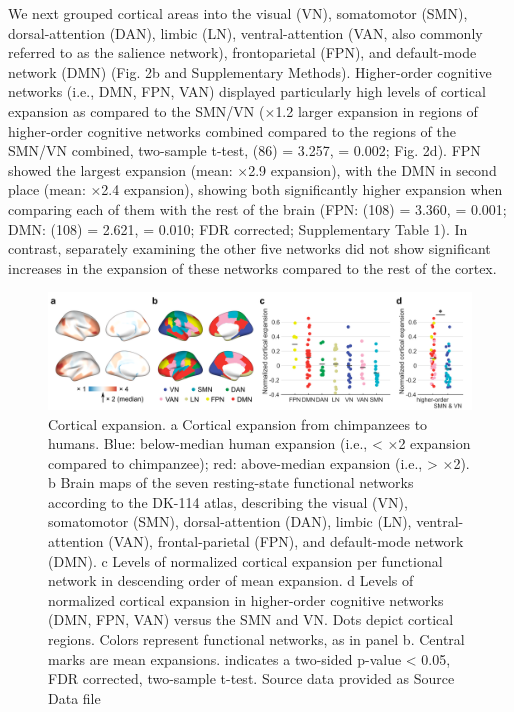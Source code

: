 \begin{refsection}
We next grouped cortical areas into the visual (VN), somatomotor (SMN), dorsal-attention (DAN), limbic (LN), ventral-attention (VAN, also commonly referred to as the salience network), frontoparietal (FPN), and default-mode network (DMN) (Fig. 2b and Supplementary Methods)\citep{thomas2011organization}. Higher-order cognitive networks (i.e., DMN, FPN, VAN) displayed particularly high levels of cortical expansion as compared to the SMN/VN ($\times$1.2 larger expansion in regions of higher-order cognitive networks combined compared to the regions of the SMN/VN combined, two-sample t-test, \tvaldf(86) = 3.257, \pval = 0.002; Fig. 2d). FPN showed the largest expansion (mean: $\times$2.9 expansion), with the DMN in second place (mean: $\times$2.4 expansion), showing both significantly higher expansion when comparing each of them with the rest of the brain (FPN: \tvaldf(108) = 3.360, \pval = 0.001; DMN: \tvaldf(108) = 2.621, \pval = 0.010; FDR corrected; Supplementary Table 1). In contrast, separately examining the other five networks did not show significant increases in the expansion of these networks compared to the rest of the cortex.

\begin{figure}[h]
    \centering
    \includegraphics[width=\linewidth]{images/harFig2.png}
    \caption{Cortical expansion. a Cortical expansion from chimpanzees to humans. Blue: below-median human expansion (i.e., < $\times$2 expansion compared to chimpanzee); red: above-median expansion (i.e., > $\times$2). b Brain maps of the seven resting-state functional networks according to the DK-114 atlas, describing the visual (VN), somatomotor (SMN), dorsal-attention (DAN), limbic (LN), ventral-attention (VAN), frontal-parietal (FPN), and default-mode network (DMN). c Levels of normalized cortical expansion per functional network in descending order of mean expansion. d Levels of normalized cortical expansion in higher-order cognitive networks (DMN, FPN, VAN) versus the SMN and VN. Dots depict cortical regions. Colors represent functional networks, as in panel b. Central marks are mean expansions. \* indicates a two-sided p-value < 0.05, FDR corrected, two-sample t-test. Source data provided as Source Data file}
    \label{harFig2}
\end{figure}


\end{refsection}
